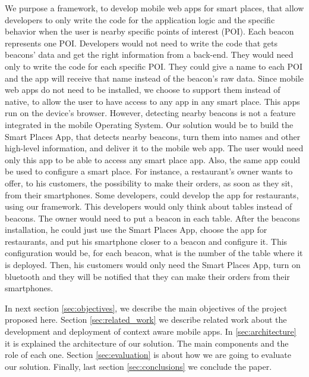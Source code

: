 We purpose a framework, to develop mobile web apps for smart
places, that allow developers to only write the code
for the application logic and the specific behavior when
the user is nearby specific points of interest (POI).
Each beacon represents one POI. Developers would not need
to write the code that gets beacons' data and get the
right information from a back-end. They would need only
to write the code for each specific POI. They could give
a name to each POI and the app will receive that name 
instead of the beacon's raw data. Since mobile web
apps do not need to be installed, we choose to support
them instead of native, to allow
the user to have access to any app in any smart place.
This apps run on the device's browser. However, detecting
nearby beacons is not a feature integrated in the mobile
Operating System. Our solution would be to build the
Smart Places App,
that detects nearby beacons, turn them into names and
other high-level information, and deliver it to the
mobile web app. The user would need only this app to
be able to access any smart place app. Also, the same app
could be used to configure a smart place.
For instance, a restaurant's owner wants to offer, to
his customers, the possibility to make their orders,
as soon as they sit, from their smartphones. Some
developers, could develop the app for restaurants,
using our framework. This developers would only think
about tables instead of beacons. The owner would need
to put a beacon in each table. After the beacons
installation, he could just use the Smart Places App,
choose the app for restaurants, and put his smartphone
closer to a beacon and configure it. This configuration
would be, for each beacon, what is the number of the table
where it is deployed. Then, his customers would only
need the Smart Places App, turn on bluetooth and they will
be notified that they can make their orders from their
smartphones.

In next section \ref{sec:objectives}, we describe the main
objectives of the project proposed here.
Section \ref{sec:related_work} we describe related
work about the development and deployment of
context aware mobile apps.
In \ref{sec:architecture} it is explained the architecture of our solution. The main components and the role of
each one.
Section \ref{sec:evaluation} is about how we are going
to evaluate our solution.
Finally, last section \ref{sec:conclusions} we conclude
the paper.
